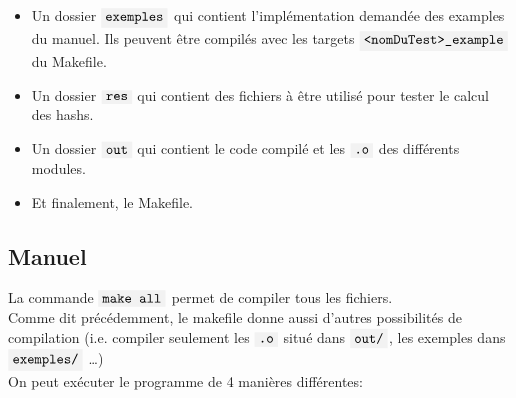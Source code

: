 \documentclass[french]{article}
\newcommand{\code}[1]{$\mbox{\colorbox{light-gray}{\texttt{#1}}}$}
\begin{document}
\begin{itemize}
    \item Un dossier \code{exemples} qui contient l'implémentation demandée des examples du manuel. Ils peuvent être compilés avec les targets \code{<nomDuTest>\_example} du Makefile.
    
    \item Un dossier \code{res} qui contient des fichiers à être utilisé pour tester le calcul des hashs. 
    
    \item Un dossier \code{out} qui contient le code compilé et les \code{.o} des différents modules.
    
    \item Et finalement, le Makefile.
    
\end{itemize}

\subsection{Manuel}

La commande \code{make all} permet de compiler tous les fichiers.\\

Comme dit précédemment, le makefile donne aussi d'autres possibilités de compilation (i.e. compiler seulement les \code{.o} situé dans \code{out/}, les exemples dans \code{exemples/} \ldots) \\

On peut exécuter le programme de 4 manières différentes:
\end{document}
